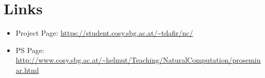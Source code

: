 \documentclass[12pt,fleqn,a4paper]{article}
\begin{document}
\newpage


\section{Links}

\begin{itemize}
\item Project Page: \url{https://student.cosy.sbg.ac.at/~tdafir/nc/}
\item PS Page:
\url{http://www.cosy.sbg.ac.at/~helmut/Teaching/NaturalComputation/proseminar.html}

\end{itemize}

\nocite{*}

\end{document}
